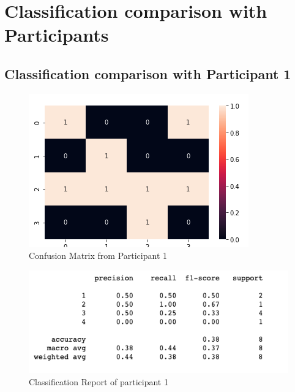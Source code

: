 \pagebreak

\section{Classification comparison with Participants}

\subsection*{Classification comparison with Participant 1 }

\begin{figure}[!htp]
    \includegraphics[width=\textwidth]{Images/p1.png}
    \caption{Confusion Matrix from Participant 1}
    \label{fig:f11}
\end{figure}

\begin{figure}[!htp]
    \includegraphics[width=\textwidth]{Images/p1r.png}
    \caption{Classification Report of participant 1}
    \label{fig:f11}
\end{figure}

\pagebreak


